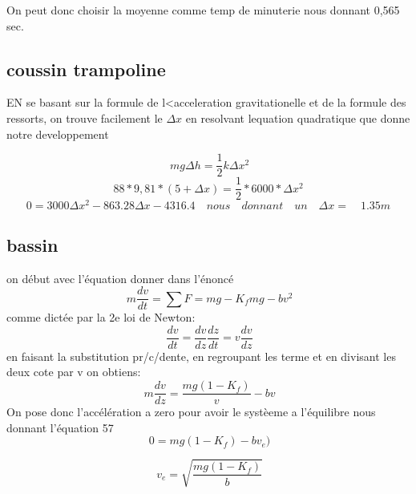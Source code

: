 \documentclass{article}
\begin{document}
 \vspace*{4mm}
 
On peut donc choisir la moyenne comme temp de minuterie nous donnant 0,565 sec.
 
 
 \subsection{coussin trampoline}
 
 EN se basant sur la formule de l<acceleration gravitationelle et de la formule des ressorts, on trouve facilement le $\Delta x$ en resolvant lequation quadratique que donne notre developpement
 
 \begin{equation}
\ mg \Delta h = \frac{1}{2}k \Delta x ^2
 \end{equation}
 \begin{equation}
 88*9,81*(5+\Delta x) = \frac{1}{2}*6000*\Delta x^2 
 \end{equation}
 \begin{equation}
 0 = 3000\Delta x^2 - 863.28 \Delta x - 4316.4 \quad nous\quad  donnant\quad  un\quad  \Delta x=\quad 1.35m 
 \end{equation}

\subsection{bassin}

on début avec l'équation donner dans l'énoncé
\begin{equation}
\ m \frac{dv}{dt} = \sum F = mg - K_{f}mg - bv^2
\end{equation}
comme dictée par la 2e loi de Newton:
\begin{equation}
\ \frac{dv}{dt} = \frac{dv}{dz} \frac{dz}{dt} = v\frac{dv}{dz}
\end{equation}
en faisant la substitution pr/c/dente, en regroupant les terme et en divisant les deux cote par v on obtiens:
\begin{equation}
\ m\frac{dv}{dz} =  \frac{mg ( 1- K_{f})}{v} - bv
\end{equation}
On pose donc l'accélération a zero pour avoir le systèeme a l'équilibre nous donnant l'équation 57
\begin{equation}
\ 0 =  mg ( 1- K_{f}) - bv_{e})
\end{equation}

\begin{equation}
\ v_{e} = \sqrt{\frac{mg(1-K_{f})}{b}}
\end{equation}
\end{document}
